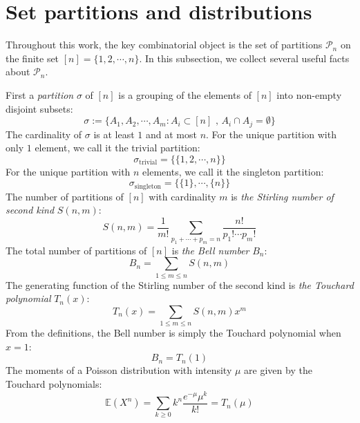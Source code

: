 \documentclass[a4paper,11pt]{article}
\theoremstyle{definition}
\numberwithin{equation}{section}
\begin{document}
\section{Set partitions and distributions}\label{app:setpartitions}

Throughout this work, the key combinatorial object is the set of partitions $\mathcal{P}_n$ on the finite set $[n] = \{1,2,\cdots,n\}$. In this subsection, we collect several useful facts about $\mathcal{P}_n$.

First a \textit{partition} $\sigma$ of $[n]$ is a grouping of the elements of $[n]$ into non-empty disjoint subsets:
\begin{equation}
    \sigma := \{A_1,A_2,\cdots,A_m: A_i \subset [n]\text{ , }A_i\cap A_j = \emptyset\}
\end{equation}
The cardinality of $\sigma$ is at least $1$ and at most $n$. For the unique partition with only $1$ element, we call it the trivial partition:
\begin{equation}
    \sigma_\text{trivial} = \{\{1,2,\cdots,n\}\}
\end{equation}
For the unique partition with $n$ elements, we call it the singleton partition:
\begin{equation}
    \sigma_\text{singleton} = \{\{1\},\cdots,\{n\}\}
\end{equation}
The number of partitions of $[n]$ with cardinality $m$ is \textit{the Stirling number of second kind} $S(n,m)$:
\begin{equation}
    S(n,m) = \frac{1}{m!}\sum_{p_1 + \cdots + p_m = n}\frac{n!}{p_1!\cdots p_m!}
\end{equation}
The total number of partitions of $[n]$ is \textit{the Bell number} $B_n$:
\begin{equation}
    B_n = \sum_{1\leq m\leq n}S(n,m)
\end{equation}
The generating function of the Stirling number of the second kind is \textit{the Touchard polynomial} $T_n(x)$:
\begin{equation}
    T_n(x) = \sum_{1\leq m\leq n}S(n,m)x^m
\end{equation}
From the definitions, the Bell number is simply the Touchard polynomial when $x = 1$:
\begin{equation}
    B_n = T_n(1)
\end{equation}
The moments of a Poisson distribution with intensity $\mu$ are given by the Touchard polynomials:
\begin{equation}
    \mathbb{E}(X^n) = \sum_{k\geq 0}k^n\frac{e^{-\mu}\mu^k}{k!}=  T_n(\mu)
\end{equation}
\end{document}
